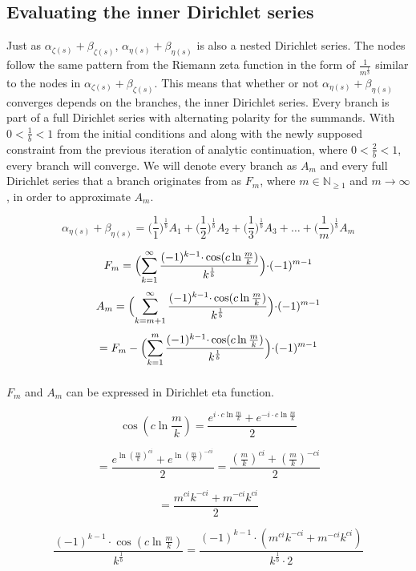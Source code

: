 \documentclass{amsart}
\begin{document}
	\subsection{Evaluating the inner Dirichlet series}
	Just as $\alpha_{\zeta(s)} + \beta_{\zeta(s)}$, $\alpha_{\eta(s)} + \beta_{\eta(s)}$ is also a nested Dirichlet series. The nodes follow the same pattern from the Riemann zeta function in the form of $\frac{1}{m^{\frac{1}{b}}}$ similar to the nodes in $\alpha_{\zeta(s)} + \beta_{\zeta(s)}$. This means that whether or not $\alpha_{\eta(s)} + \beta_{\eta(s)}$ converges depends on the branches, the inner Dirichlet series. Every branch is part of a full Dirichlet series with alternating polarity for the summands. With $0 < \frac{1}{b} < 1$ from the initial conditions and along with the newly supposed constraint from the previous iteration of analytic continuation, where $0 < \frac{2}{b} < 1$, every branch will converge. We will denote every branch as $A_m$ and every full Dirichlet series that a branch originates from as $F_m$, where $m \in \mathbb{N}_{\geq 1}$ and $m \to \infty$, in order to approximate $A_m$.
	
	\[ \alpha_{\eta(s)} + \beta_{\eta(s)} = \Big(\frac{1}{1}\Big)^{\frac{1}{b}}A_1 + \Big(\frac{1}{2}\Big)^{\frac{1}{b}}A_2 + \Big(\frac{1}{3}\Big)^{\frac{1}{b}}A_3 + \dots + \Big(\frac{1}{m}\Big)^{\frac{1}{b}}A_m \]
	
	\[ F_m = \Bigl( \sum\limits_{k=1}^{\infty} \frac{(-1)^{k-1} {\cdot} \cos(c \ln \frac{m}{k})}{k^{\frac{1}{b}}}  \Bigr) {\cdot} (-1)^{m-1} \]
	\[ A_m = \Bigl( \sum\limits_{k=m+1}^{\infty} \frac{(-1)^{k-1} {\cdot} \cos(c \ln \frac{m}{k})}{k^{\frac{1}{b}}} \Bigr) {\cdot} (-1)^{m-1} \]
	\[ = F_m - \Bigl( \sum\limits_{k=1}^{m} \frac{(-1)^{k-1} {\cdot} \cos(c \ln \frac{m}{k})}{k^{\frac{1}{b}}} \Bigr) {\cdot} (-1)^{m-1} \]
	\[\]
	
	$F_m$ and $A_m$ can be expressed in Dirichlet eta function.
	
	\[ \cos(c \ln \frac{m}{k}) = \frac{e^{i \cdot c \ln \frac{m}{k}} + e^{-i \cdot c \ln \frac{m}{k}}}{2} \]
	
	\[ = \frac{e^{\ln (\frac{m}{k})^{ci}} + e^{\ln (\frac{m}{k})^{-ci}}}{2} = \frac{(\frac{m}{k})^{ci} + (\frac{m}{k})^{-ci}}{2} \]
	
	\[ = \frac{m^{ci}k^{-ci} + m^{-ci}k^{ci}}{2} \]
	
	\[ \frac{(-1)^{k-1} \cdot \cos(c \ln \frac{m}{k})}{k^{\frac{1}{b}}} = \frac{ (-1)^{k-1} {\cdot} (m^{ci}k^{-ci} + m^{-ci}k^{ci}) }{k^{\frac{1}{b}} \cdot 2}  \]
	
\end{document}
